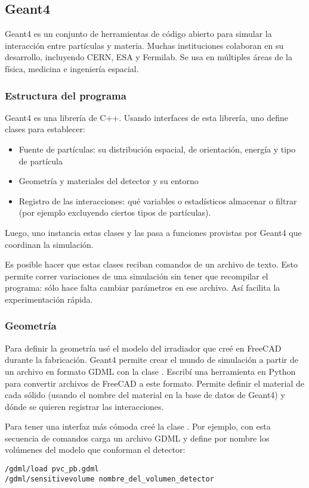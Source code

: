 \subsection{Geant4}
Geant4 es un conjunto de herramientas de código abierto
para simular la interacción entre partículas y materia.
Muchas instituciones colaboran en su desarrollo,
incluyendo CERN, ESA y Fermilab.
Se usa en múltiples áreas de la física, medicina e ingeniería espacial.
\subsubsection{Estructura del programa}
Geant4 es una librería de C++.
Usando interfaces de esta librería,
uno define clases para establecer:
\begin{itemize}
    \item Fuente de partículas: su distribución espacial, de orientación, energía
        y tipo de partícula
    \item Geometría y materiales del detector y su entorno
    \item Registro de las interacciones: qué variables o estadísticos
        almacenar o filtrar (por ejemplo excluyendo ciertos tipos de
        partículas).
\end{itemize}
Luego, uno instancia estas clases y las pasa a funciones provistas por Geant4
que coordinan la simulación.

Es posible hacer que estas clases reciban comandos de un archivo de texto.
Esto permite correr variaciones de una simulación sin tener que recompilar el
programa: sólo hace falta cambiar parámetros en ese archivo.
Así facilita la experimentación rápida.
\subsubsection{Geometría}
Para definir la geometría usé el modelo del irradiador que creé en FreeCAD
durante la fabricación.
Geant4 permite crear el mundo de simulación a partir de un archivo
en formato GDML\cite{chytracek_geometry_2006}
con la clase .
Escribí una herramienta en Python para convertir archivos 
 de FreeCAD
a este formato.
Permite definir el material de cada sólido
(usando el nombre del material en la base de datos de Geant4)
y dónde se quieren registrar las interacciones.

Para tener una interfaz más cómoda creé la clase
. 
Por ejemplo, con esta secuencia de comandos carga un archivo GDML y define
por nombre los volúmenes del modelo que conforman el detector:
\begin{verbatim}
/gdml/load pvc_pb.gdml
/gdml/sensitivevolume nombre_del_volumen_detector
\end{verbatim}

